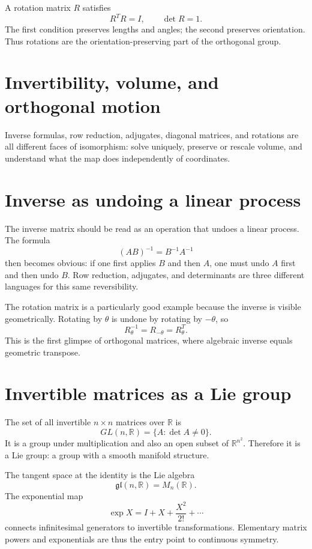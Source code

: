 A rotation matrix \(R\) satisfies
\[
  R^TR=I,\qquad \det R=1.
\]
The first condition preserves lengths and angles; the second preserves orientation.  Thus rotations are the orientation-preserving part of the orthogonal group.

\section{Invertibility, volume, and orthogonal motion}

Inverse formulas, row reduction, adjugates, diagonal matrices, and rotations are all different faces of isomorphism: solve uniquely, preserve or rescale volume, and understand what the map does independently of coordinates.

\section{Inverse as undoing a linear process}

The inverse matrix should be read as an operation that undoes a linear process.  The formula
\[
  (AB)^{-1}=B^{-1}A^{-1}
\]
then becomes obvious: if one first applies \(B\) and then \(A\), one must undo \(A\) first and then undo \(B\).  Row reduction, adjugates, and determinants are three different languages for this same reversibility.

The rotation matrix is a particularly good example because the inverse is visible geometrically.  Rotating by \(\theta\) is undone by rotating by \(-\theta\), so
\[
  R_\theta^{-1}=R_{-\theta}=R_\theta^T.
\]
This is the first glimpse of orthogonal matrices, where algebraic inverse equals geometric transpose.

\section{Invertible matrices as a Lie group}

The set of all invertible $n\times n$ matrices over $\mathbb R$ is
\[
  GL(n,\mathbb R)=\{A:\det A\ne0\}.
\]
It is a group under multiplication and also an open subset of $\mathbb R^{n^2}$.  Therefore it is a Lie group: a group with a smooth manifold structure.

The tangent space at the identity is the Lie algebra
\[
  \mathfrak{gl}(n,\mathbb R)=M_n(\mathbb R).
\]
The exponential map
\[
  \exp X=I+X+\frac{X^2}{2!}+\cdots
\]
connects infinitesimal generators to invertible transformations.  Elementary matrix powers and exponentials are thus the entry point to continuous symmetry.

